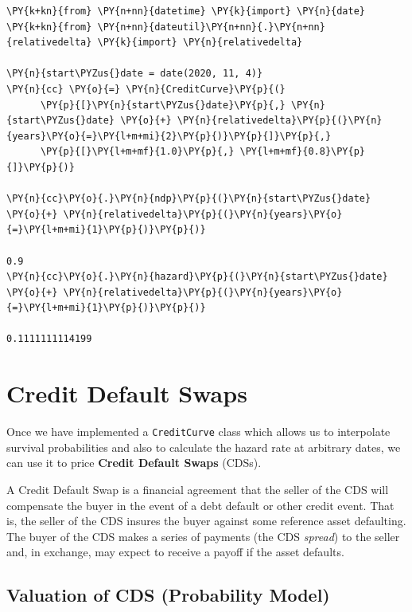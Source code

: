 \begin{codebox}
\begin{Verbatim}[commandchars=\\\{\}]
\PY{k+kn}{from} \PY{n+nn}{datetime} \PY{k}{import} \PY{n}{date}
\PY{k+kn}{from} \PY{n+nn}{dateutil}\PY{n+nn}{.}\PY{n+nn}{relativedelta} \PY{k}{import} \PY{n}{relativedelta}

\PY{n}{start\PYZus{}date = date(2020, 11, 4)}        
\PY{n}{cc} \PY{o}{=} \PY{n}{CreditCurve}\PY{p}{(}
      \PY{p}{[}\PY{n}{start\PYZus{}date}\PY{p}{,} \PY{n}{start\PYZus{}date} \PY{o}{+} \PY{n}{relativedelta}\PY{p}{(}\PY{n}{years}\PY{o}{=}\PY{l+m+mi}{2}\PY{p}{)}\PY{p}{]}\PY{p}{,}
      \PY{p}{[}\PY{l+m+mf}{1.0}\PY{p}{,} \PY{l+m+mf}{0.8}\PY{p}{]}\PY{p}{)}

\PY{n}{cc}\PY{o}{.}\PY{n}{ndp}\PY{p}{(}\PY{n}{start\PYZus{}date} \PY{o}{+} \PY{n}{relativedelta}\PY{p}{(}\PY{n}{years}\PY{o}{=}\PY{l+m+mi}{1}\PY{p}{)}\PY{p}{)}

0.9
\PY{n}{cc}\PY{o}{.}\PY{n}{hazard}\PY{p}{(}\PY{n}{start\PYZus{}date} \PY{o}{+} \PY{n}{relativedelta}\PY{p}{(}\PY{n}{years}\PY{o}{=}\PY{l+m+mi}{1}\PY{p}{)}\PY{p}{)}

0.1111111114199
\end{Verbatim}
\end{codebox}    
            
\section{Credit Default Swaps}\label{credit-deafult-swaps}

Once we have implemented a \texttt{CreditCurve} class which allows us to
interpolate survival probabilities and also to calculate the hazard rate at arbitrary
dates, we can use it to price \textbf{Credit Default Swaps} (CDSs).

A Credit Default Swap is a financial agreement that the seller of the CDS will compensate the buyer in the event of a debt default or other credit event. 
That is, the seller of the CDS insures the buyer against some reference asset defaulting. The buyer of the CDS makes a series of payments (the CDS \emph{spread}) to the seller and, in exchange, may expect to receive a payoff if the asset defaults.

\subsection{Valuation of CDS (Probability Model)}
\label{sec:cds_valuation}

